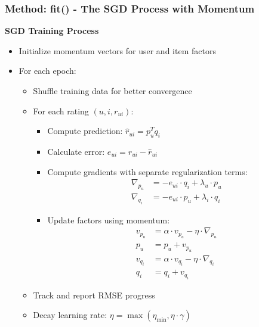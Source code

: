 \documentclass{beamer}
\begin{document}
\begin{frame}
\frametitle{Method: fit() - The SGD Process with Momentum}
    \textbf{SGD Training Process}
    \begin{itemize}
        \item Initialize momentum vectors for user and item factors
        \item For each epoch:
        \begin{itemize}
            \item Shuffle training data for better convergence
            \item For each rating $(u, i, r_{ui})$:
            \begin{itemize}
                \item Compute prediction: $\hat{r}_{ui} = p_u^T q_i$
                \item Calculate error: $e_{ui} = r_{ui} - \hat{r}_{ui}$
                \item Compute gradients with separate regularization terms:
                \begin{align*}
                \nabla_{p_u} &= -e_{ui} \cdot q_i + \lambda_u \cdot p_u \\
                \nabla_{q_i} &= -e_{ui} \cdot p_u + \lambda_i \cdot q_i
                \end{align*}
                \item Update factors using momentum:
                \begin{align*}
                v_{p_u} &= \alpha \cdot v_{p_u} - \eta \cdot \nabla_{p_u} \\
                p_u &= p_u + v_{p_u} \\
                v_{q_i} &= \alpha \cdot v_{q_i} - \eta \cdot \nabla_{q_i} \\
                q_i &= q_i + v_{q_i}
                \end{align*}
            \end{itemize}
            \item Track and report RMSE progress
            \item Decay learning rate: $\eta = \max(\eta_{\min}, \eta \cdot \gamma)$
        \end{itemize}
    \end{itemize}
\end{frame}
\end{document}
